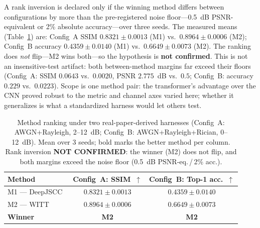 \documentclass[conference]{IEEEtran}
\begin{document}
A rank inversion is declared only if the winning method differs between configurations by
more than the pre-registered noise floor---0.5~dB PSNR-equivalent or 2\% absolute
accuracy---over three seeds. The measured means (Table~\ref{tab:inv}) are: Config~A SSIM
$0.8321\pm0.0013$ (M1) vs.\ $0.8964\pm0.0006$ (M2); Config~B accuracy $0.4359\pm0.0140$
(M1) vs.\ $0.6649\pm0.0073$ (M2). The ranking does \emph{not} flip---M2 wins both---so the
hypothesis is \textbf{not confirmed}. This is not an insensitive-test artifact: both
between-method margins far exceed their floors (Config~A: SSIM $0.0643$ vs.\ $0.0020$,
PSNR $2.775$~dB vs.\ $0.5$; Config~B: accuracy $0.229$ vs.\ $0.0223$). Scope is one method
pair: the transformer's advantage over the CNN proved robust to the metric and channel
axes varied here; whether it generalizes is what a standardized harness would let others
test.

\begin{table}[t]
\centering
\footnotesize
\caption{Method ranking under two real-paper-derived harnesses (Config~A: AWGN+Rayleigh, 2--12~dB; Config~B: AWGN+Rayleigh+Rician, 0--12~dB). Mean over 3 seeds; bold marks the better method per column. Rank inversion \textbf{NOT CONFIRMED}: the winner (M2) does not flip, and both margins exceed the noise floor (0.5~dB PSNR-eq.\,/\,2\% acc.).}
\label{tab:inv}
\begin{tabular}{@{}lcc@{}}
\toprule
Method & Config~A: SSIM~$\uparrow$ & Config~B: Top-1 acc.~$\uparrow$ \\
\midrule
M1 --- DeepJSCC~\cite{deepjscc} & $0.8321\pm0.0013$ & $0.4359\pm0.0140$ \\
M2 --- WITT~\cite{witt}         & $\mathbf{0.8964\pm0.0006}$ & $\mathbf{0.6649\pm0.0073}$ \\
\midrule
\textbf{Winner} & \textbf{M2} & \textbf{M2} \\
\bottomrule
\end{tabular}
\end{table}
\end{document}

